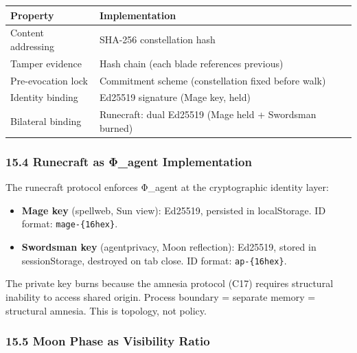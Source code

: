 \documentclass[
]{article}
\newcounter{none} %
\providecommand{\tightlist}{%
  \setlength{\itemsep}{0pt}\setlength{\parskip}{0pt}}
\begin{document}
{\def\LTcaptype{none} %
\begin{longtable}[]{@{}
  >{\raggedright\arraybackslash}p{}
  >{\raggedright\arraybackslash}p{}@{}}
\toprule\noalign{}
\begin{minipage}[b]{\linewidth}\raggedright
Property
\end{minipage} & \begin{minipage}[b]{\linewidth}\raggedright
Implementation
\end{minipage} \\
\midrule\noalign{}
\endhead
\bottomrule\noalign{}
\endlastfoot
Content addressing & SHA-256 constellation hash \\
Tamper evidence & Hash chain (each blade references previous) \\
Pre-evocation lock & Commitment scheme (constellation fixed before
walk) \\
Identity binding & Ed25519 signature (Mage key, held) \\
Bilateral binding & Runecraft: dual Ed25519 (Mage held + Swordsman
burned) \\
\end{longtable}
}

\subsubsection{15.4 Runecraft as Φ\_agent
Implementation}\label{runecraft-as-ux3c6_agent-implementation}

The runecraft protocol enforces Φ\_agent at the cryptographic identity
layer:

\begin{itemize}
\tightlist
\item
  \textbf{Mage key} (spellweb, Sun view): Ed25519, persisted in
  localStorage. ID format: \texttt{mage-\{16hex\}}.
\item
  \textbf{Swordsman key} (agentprivacy, Moon reflection): Ed25519,
  stored in sessionStorage, destroyed on tab close. ID format:
  \texttt{ap-\{16hex\}}.
\end{itemize}

The private key burns because the amnesia protocol (C17) requires
structural inability to access shared origin. Process boundary =
separate memory = structural amnesia. This is topology, not policy.

\subsubsection{15.5 Moon Phase as Visibility
Ratio}\label{moon-phase-as-visibility-ratio}
\end{document}
